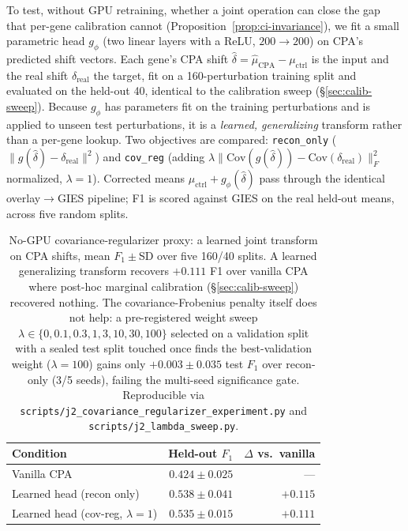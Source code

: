 \documentclass{article}
\theoremstyle{plain}
\theoremstyle{definition}
\theoremstyle{remark}
\begin{document}
To test, without GPU retraining, whether a joint operation can close the gap that per-gene calibration cannot (Proposition~\ref{prop:ci-invariance}), we fit a small parametric head $g_\phi$ (two linear layers with a ReLU, $200{\to}200$) on CPA's predicted shift vectors. Each gene's CPA shift $\hat\delta = \hat\mu_{\text{CPA}} - \mu_{\text{ctrl}}$ is the input and the real shift $\delta_{\text{real}}$ the target, fit on a 160-perturbation training split and evaluated on the held-out 40, identical to the calibration sweep (\S\ref{sec:calib-sweep}). Because $g_\phi$ has parameters fit on the training perturbations and is applied to unseen test perturbations, it is a \emph{learned, generalizing} transform rather than a per-gene lookup. Two objectives are compared: \texttt{recon\_only} ($\lVert g(\hat\delta)-\delta_{\text{real}}\rVert^2$) and \texttt{cov\_reg} (adding $\lambda\lVert\mathrm{Cov}(g(\hat\delta))-\mathrm{Cov}(\delta_{\text{real}})\rVert_F^2$ normalized, $\lambda=1$). Corrected means $\mu_{\text{ctrl}}+g_\phi(\hat\delta)$ pass through the identical overlay$\to$GIES pipeline; F1 is scored against GIES on the real held-out means, across five random splits.

\begin{table}[h]
\centering
\small
\begin{tabular}{lrr}
\toprule
\textbf{Condition} & \textbf{Held-out $F_1$} & \textbf{$\Delta$ vs.\ vanilla} \\
\midrule
Vanilla CPA              & $0.424 \pm 0.025$ & --- \\
Learned head (recon only) & $0.538 \pm 0.041$ & $+0.115$ \\
Learned head (cov-reg, $\lambda{=}1$) & $0.535 \pm 0.015$ & $+0.111$ \\
\bottomrule
\end{tabular}
\caption{No-GPU covariance-regularizer proxy: a learned joint transform on CPA shifts, mean $F_1\pm$SD over five 160/40 splits. A learned generalizing transform recovers $+0.111$ F1 over vanilla CPA where post-hoc marginal calibration (\S\ref{sec:calib-sweep}) recovered nothing. The covariance-Frobenius penalty itself does not help: a pre-registered weight sweep $\lambda\in\{0,0.1,0.3,1,3,10,30,100\}$ selected on a validation split with a sealed test split touched once finds the best-validation weight ($\lambda{=}100$) gains only $+0.003\pm0.035$ test $F_1$ over recon-only (3/5 seeds), failing the multi-seed significance gate. Reproducible via \texttt{scripts/j2\_covariance\_regularizer\_experiment.py} and \texttt{scripts/j2\_lambda\_sweep.py}.}
\label{tab:j2}
\end{table}
\end{document}
